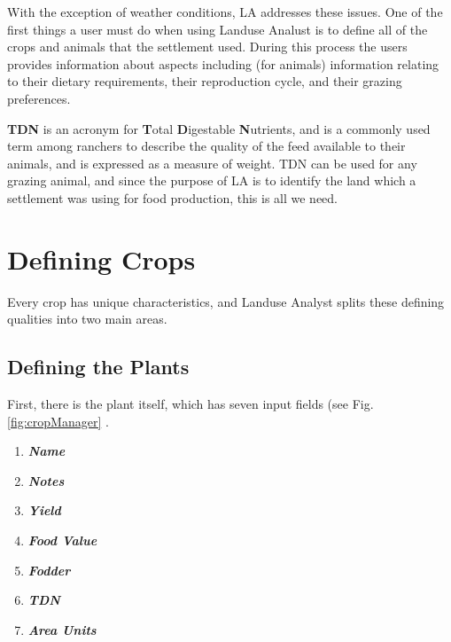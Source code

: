 With the exception of weather conditions, LA addresses these issues.  One of
the first things a user must do when using Landuse Analust is to define all
of the crops and animals that the settlement used.  During this process the
users provides information about aspects including (for animals) information
relating to their dietary requirements, their reproduction cycle, and their
grazing preferences.  


      \label{TDN}
    \textbf{TDN} is an acronym for \textbf{T}otal \textbf{D}igestable
    \textbf{N}utrients, and is a commonly used term among ranchers to describe
    the quality of the feed available to their animals, and is expressed as a
    measure of weight.  TDN can be used for any grazing animal, and since the
purpose of LA is to identify the land which a settlement was using for food
production, this is all we need.


\section{Defining Crops}Every crop has unique
characteristics, and Landuse Analyst splits these defining qualities into two
main areas.
  \subsection{Defining the Plants}First, there is
the plant itself, which has seven input fields (see Fig. \ref{fig:cropManager} .
    \begin{enumerate}
      \item \textbf{\textit{Name}}

      \item \textbf{\textit{Notes}}

      \item \textbf{\textit{Yield}}

      \item \textbf{\textit{Food Value}}

      \item \textbf{\textit{Fodder}}

      \item \textbf{\textit{TDN}}

      \item \textbf{\textit{Area Units}}
    \end{enumerate}


